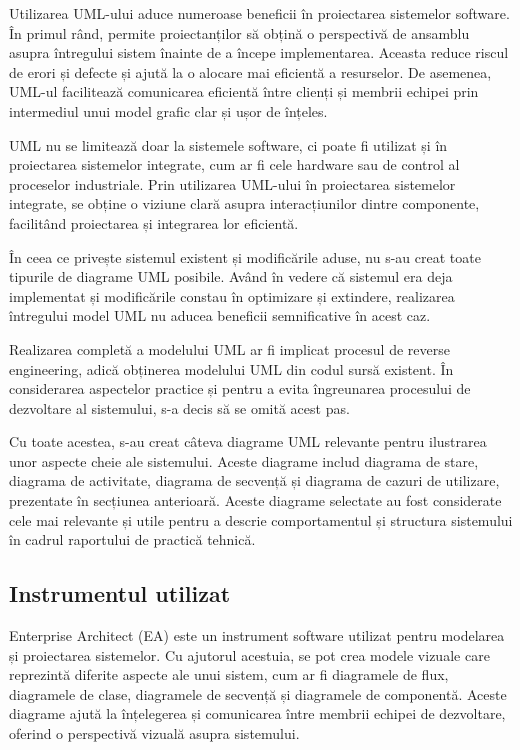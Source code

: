 Utilizarea UML-ului aduce numeroase beneficii în proiectarea sistemelor software. În primul rând, permite proiectanților să obțină o perspectivă de ansamblu asupra întregului sistem înainte de a începe implementarea. Aceasta reduce riscul de erori și defecte și ajută la o alocare mai eficientă a resurselor. De asemenea, UML-ul facilitează comunicarea eficientă între clienți și membrii echipei prin intermediul unui model grafic clar și ușor de înțeles.

UML nu se limitează doar la sistemele software, ci poate fi utilizat și în proiectarea sistemelor integrate, cum ar fi cele hardware sau de control al proceselor industriale. Prin utilizarea UML-ului în proiectarea sistemelor integrate, se obține o viziune clară asupra interacțiunilor dintre componente, facilitând proiectarea și integrarea lor eficientă.

În ceea ce privește sistemul existent și modificările aduse, nu s-au creat toate tipurile de diagrame UML posibile. Având în vedere că sistemul era deja implementat și modificările constau în optimizare și extindere, realizarea întregului model UML nu aducea beneficii semnificative în acest caz.

Realizarea completă a modelului UML ar fi implicat procesul de reverse engineering, adică obținerea modelului UML din codul sursă existent. În considerarea aspectelor practice și pentru a evita îngreunarea procesului de dezvoltare al sistemului, s-a decis să se omită acest pas.

Cu toate acestea, s-au creat câteva diagrame UML relevante pentru ilustrarea unor aspecte cheie ale sistemului. Aceste diagrame includ diagrama de stare, diagrama de activitate, diagrama de secvență și diagrama de cazuri de utilizare, prezentate în secțiunea anterioară. Aceste diagrame selectate au fost considerate cele mai relevante și utile pentru a descrie comportamentul și structura sistemului în cadrul raportului de practică tehnică.

\subsection{Instrumentul utilizat}

Enterprise Architect (EA) este un instrument software utilizat pentru modelarea și proiectarea sistemelor. Cu ajutorul acestuia, se pot crea modele vizuale care reprezintă diferite aspecte ale unui sistem, cum ar fi diagramele de flux, diagramele de clase, diagramele de secvență și diagramele de componentă. Aceste diagrame ajută la înțelegerea și comunicarea între membrii echipei de dezvoltare, oferind o perspectivă vizuală asupra sistemului.

